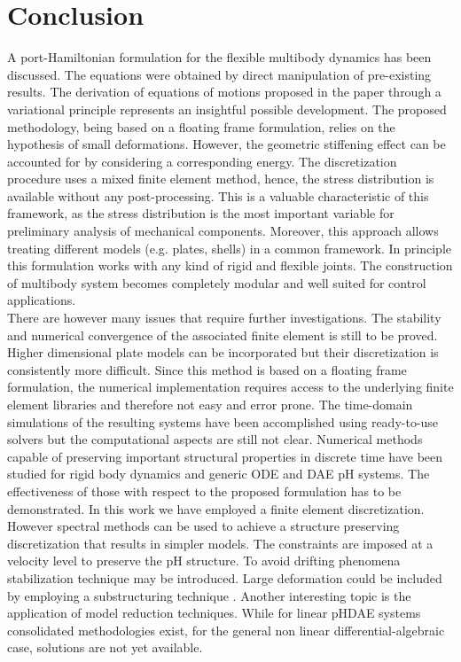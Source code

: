 \documentclass{svjour3}                     %
\newcommand{\firstRev}[1]{\textcolor{red!80!black}{#1}}
\newcommand{\secondRev}[1]{\textcolor{blue!80!black}{#1}}
\begin{document}
\section{Conclusion}
A port-Hamiltonian formulation for the flexible multibody dynamics has been discussed. \firstRev{The equations were obtained by direct manipulation of pre-existing results. The derivation of equations of motions proposed in the paper through a variational principle represents an insightful possible development.} The proposed methodology, being based on a floating frame formulation, relies on the hypothesis of small deformations. However, the geometric stiffening effect can be accounted for by considering a corresponding energy. The discretization procedure uses a mixed finite element method, hence, the stress distribution is available without any post-processing. This is a valuable characteristic of this framework, as the stress distribution is the most important variable for preliminary analysis of mechanical components. Moreover, this approach allows treating different models (e.g. plates, shells) in a common framework. \firstRev{In principle this formulation works with any kind of rigid and flexible joints.} The construction of multibody system becomes completely modular and well suited for control applications.  \\

\firstRev{There are however many issues that require further investigations. The stability and numerical convergence of the associated finite element is still to be proved. Higher dimensional plate models can be incorporated but their discretization is consistently more difficult. Since this method is based on a floating frame formulation, the numerical implementation requires access to the underlying finite element libraries and therefore not easy and error prone.  The time-domain simulations of the resulting systems have been accomplished using ready-to-use solvers but the computational aspects are still not clear. Numerical methods capable of preserving important structural properties in discrete time have been studied for rigid body dynamics \cite{celledoni2018passivity} and generic ODE \cite{KOTYCZKA_dt} and DAE \cite{mehrmann2019structurepreserving} pH systems. The effectiveness of those with respect to the proposed formulation has to be demonstrated. In this work we have employed a finite element discretization. However spectral methods can be used to achieve a structure preserving discretization that results in simpler models. \secondRev{The constraints  are imposed at a velocity level to preserve the pH structure. To avoid drifting phenomena stabilization technique may be introduced.} Large deformation could be included by employing a substructuring technique \cite{SHABANA_substructure}. Another interesting topic is the application of model reduction techniques. While for linear pHDAE systems consolidated methodologies exist, for the general non linear differential-algebraic case, solutions are not yet available. 
}
  
\end{document}
